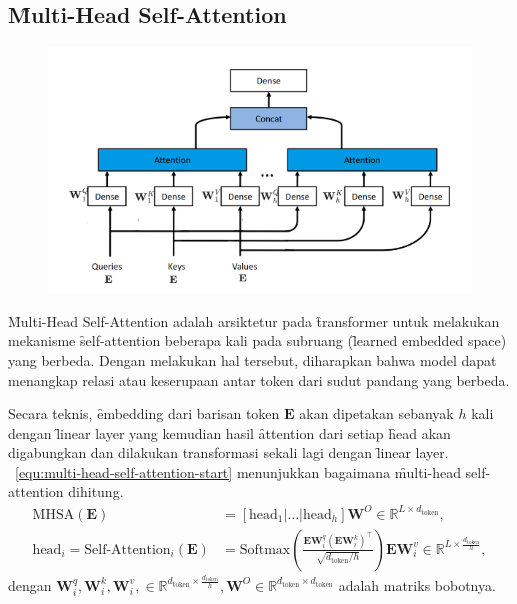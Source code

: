 	\subsection{\f{Multi-Head Self-Attention}}
	\begin{figure}[!ht]
		\centering
		\includegraphics[width=1\textwidth]{assets/pics/MHSA.png}
		\label{fig:multi-head-self-attention}
	\end{figure}

	\f{Multi-Head Self-Attention} adalah arsiktetur pada \f{transformer} untuk melakukan mekanisme \f{self-attention} beberapa kali pada subruang (\f{learned embedded space}) yang berbeda. Dengan melakukan hal tersebut, diharapkan bahwa model dapat menangkap relasi atau keserupaan antar token dari sudut pandang yang berbeda. 

	Secara teknis, \f{embedding} dari barisan token $\mathbf{E}$ akan dipetakan sebanyak $h$ kali dengan \f{linear layer} yang kemudian hasil \f{attention} dari setiap \f{head} akan digabungkan dan dilakukan transformasi sekali lagi dengan \f{linear layer}. \equ~\ref{equ:multi-head-self-attention-start} menunjukkan bagaimana \f{multi-head self-attention} dihitung.
	\begin{align}
		\label{equ:multi-head-self-attention-start}
		\text{MHSA}(\mathbf{E}) &= [\text{head}_1 | \dots | \text{head}_h] \mathbf{W}^O \in \mathbb{R}^{L \times d_{\text{token}}}, \\
		\text{head}_i = \text{Self-Attention}_i(\mathbf{E}) &= \text{Softmax}(\frac{\mathbf{E} \mathbf{W}^q_i (\mathbf{E} \mathbf{W}^k_i)^{\top}}{\sqrt{d_{\text{token}}/h}}) \mathbf{E} \mathbf{W}^v_i  \in  \mathbb{R}^{L \times \frac{d_{\text{token}}}{h}},
	\end{align}
	dengan $\mathbf{W}^q_i, \mathbf{W}^k_i, \mathbf{W}^v_i,\in \mathbb{R}^{d_{\text{token}} \times \frac{d_{\text{token}}}{h}}, \mathbf{W}^O \in \mathbb{R}^{d_{\text{token}} \times d_{\text{token}}}$ adalah matriks bobotnya.

